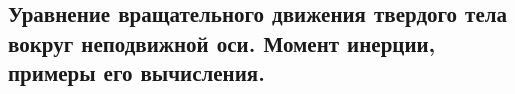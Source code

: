 \subsection{\textbf{Уравнение вращательного движения твердого тела вокруг неподвижной оси. Момент инерции, примеры его вычисления.}}